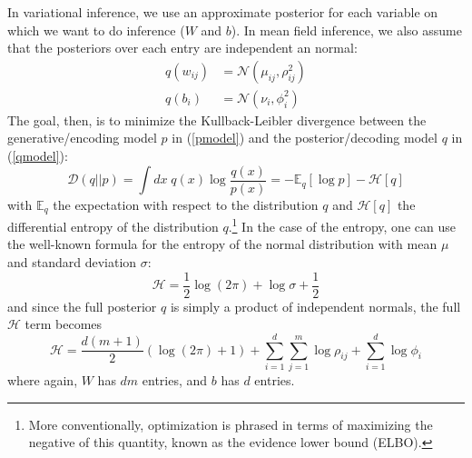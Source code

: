 \documentclass[10pt]{article}
\begin{document}
In variational inference, we use an approximate posterior for each variable on which we want to do inference ($W$ and $b$). In mean field inference, we also assume that the posteriors over each entry are independent an normal:
\begin{align}
    \label{qmodel}
    q(w_{ij}) &= \mathcal{N}(\mu_{ij}, \rho^2_{ij}) \\
    q(b_{i}) &= \mathcal{N}(\nu_{i}, \phi^2_{i})
\end{align}
The goal, then, is to minimize the Kullback-Leibler divergence between the generative/encoding model $p$ in (\ref{pmodel}) and the posterior/decoding model $q$ in (\ref{qmodel}):
\begin{equation}
    \mathcal{D}(q||p) = \int\! dx\; q(x) \log \frac{q(x)}{p(x)} = -\mathbb{E}_q[\log p] - \mathcal{H}[q]
\end{equation}
with $\mathbb{E}_q$ the expectation with respect to the distribution $q$ and $\mathcal{H}[q]$ the differential entropy of the distribution $q$.\footnote{More conventionally, optimization is phrased in terms of maximizing the negative of this quantity, known as the evidence lower bound (ELBO).} In the case of the entropy, one can use the well-known formula for the entropy of the normal distribution with mean $\mu$ and standard deviation $\sigma$:
\begin{equation}
    \mathcal{H} = \frac{1}{2}\log (2\pi) + \log \sigma + \frac{1}{2}
\end{equation}
and since the full posterior $q$ is simply a product of independent normals, the full $\mathcal{H}$ term becomes
\begin{equation}
    \mathcal{H} = \frac{d(m + 1)}{2}(\log (2\pi) + 1) + \sum_{i=1}^d\sum_{j=1}^m \log \rho_{ij} + \sum_{i=1}^d \log \phi_i
\end{equation}
where again, $W$ has $dm$ entries, and $b$ has $d$ entries.
\end{document}
